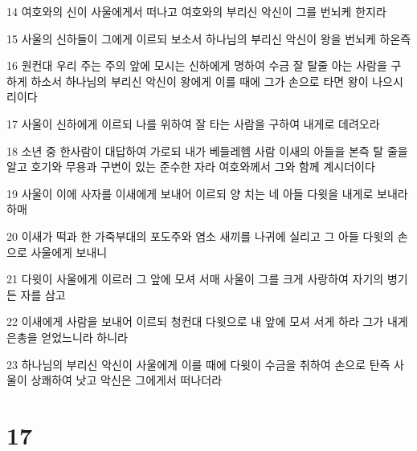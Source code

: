 \par 14 여호와의 신이 사울에게서 떠나고 여호와의 부리신 악신이 그를 번뇌케 한지라
\par 15 사울의 신하들이 그에게 이르되 보소서 하나님의 부리신 악신이 왕을 번뇌케 하온즉
\par 16 원컨대 우리 주는 주의 앞에 모시는 신하에게 명하여 수금 잘 탈줄 아는 사람을 구하게 하소서 하나님의 부리신 악신이 왕에게 이를 때에 그가 손으로 타면 왕이 나으시리이다
\par 17 사울이 신하에게 이르되 나를 위하여 잘 타는 사람을 구하여 내게로 데려오라
\par 18 소년 중 한사람이 대답하여 가로되 내가 베들레헴 사람 이새의 아들을 본즉 탈 줄을 알고 호기와 무용과 구변이 있는 준수한 자라 여호와께서 그와 함께 계시더이다
\par 19 사울이 이에 사자를 이새에게 보내어 이르되 양 치는 네 아들 다윗을 내게로 보내라 하매
\par 20 이새가 떡과 한 가죽부대의 포도주와 염소 새끼를 나귀에 실리고 그 아들 다윗의 손으로 사울에게 보내니
\par 21 다윗이 사울에게 이르러 그 앞에 모셔 서매 사울이 그를 크게 사랑하여 자기의 병기 든 자를 삼고
\par 22 이새에게 사람을 보내어 이르되 청컨대 다윗으로 내 앞에 모셔 서게 하라 그가 내게 은총을 얻었느니라 하니라
\par 23 하나님의 부리신 악신이 사울에게 이를 때에 다윗이 수금을 취하여 손으로 탄즉 사울이 상쾌하여 낫고 악신은 그에게서 떠나더라

\chapter{17}

